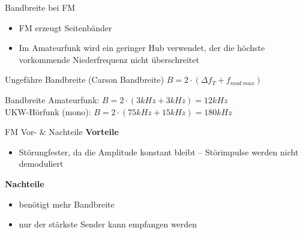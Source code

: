 \begin{frame}{Bandbreite bei FM}
  \begin{itemize}
    \item FM erzeugt Seitenbänder
    \item Im Amateurfunk wird ein geringer Hub verwendet, der die höchste vorkommende Niederfrequenz nicht überschreitet
  \end{itemize}
  \begin{block}{Ungefähre Bandbreite (Carson Bandbreite)}
    $B = 2 \cdot (\Delta f_T + f_{mod~max})$
  \end{block}
  \begin{exampleblock}{Bandbreite}
    Amateurfunk: $B =2 \cdot (3kHz + 3kHz) = 12kHz$\\
    UKW-Hörfunk (mono): $B = 2 \cdot (75kHz + 15kHz) = 180kHz$
  \end{exampleblock}
\end{frame}

\begin{frame}{FM Vor- \& Nachteile}
  \textbf{\Large{Vorteile}}
  \begin{itemize}
    \item Störungfester, da die Amplitude konstant bleibt -- Störimpulse werden
      nicht demoduliert
  \end{itemize}
  \vspace{1cm}
  \textbf{\Large{Nachteile}}
  \begin{itemize}
    \item benötigt mehr Bandbreite
    \item nur der stärkste Sender kann empfangen werden
  \end{itemize}
\end{frame}


